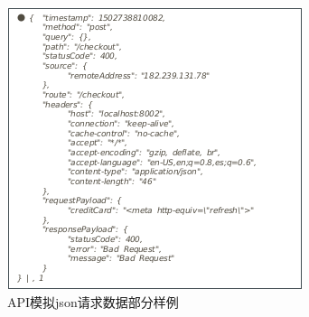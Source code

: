 \begin{figure}[!ht]
    \setlength{\abovecaptionskip}{0.cm}
    \setlength{\belowcaptionskip}{-0.cm}
    \centering
     \includegraphics[scale=0.4]{Figs/json.png}
    \caption{API模拟json请求数据部分样例}
    \label{fig:json_sample}
\end{figure}